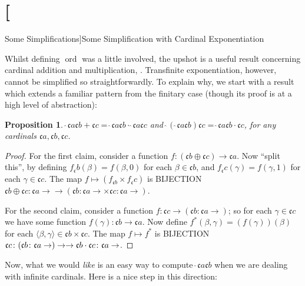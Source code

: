 \documentclass[10pt,a4paper]{article}
\makeatletter
\newcommand*{\olup}[1]{\MakeUppercase{#1}}
\theoremstyle{plain}
\newtheorem{prop}[thm]{Proposition}
\theoremstyle{definition}
\theoremstyle{remark}
\newcommand*{\olfileid}[3]{}
\newcommand*{\olsection}[1]{\section*{#1}}
\newcommand*{\ollabel}[1]{\label{#1}}
\newcommand{\olref}{\@ifnextchar[{\olref@i}{\olref@final}}
\def\olref@i[#1]{\@ifnextchar[{\olref@ii}{\olref@final}}
\def\olref@ii[#1]{\@ifnextchar[{\olref@iii}{\olref@final}}
\def\olref@iii[#1]{\olref@final}
\def\olref@final#1{\ref{#1}}
\providecommand{\tuple}[1]{\langle #1 \rangle}
\providecommand{\cardplus}{\mathbin{+}}
\providecommand{\cardtimes}{\mathbin{\cdot}}
\providecommand{\cardexpo}{\mathbin{\hat{\ }}}
\providecommand{\funfromto}[3]{#1\colon #2 \to #3}
\providecommand{\canonord}{\operatorname{ord}}
\providecommand{\cardfont}{\mathfrak{c}}
\providecommand{\disjointsum}{\mathbin{\oplus}}
\makeatother
\begin{document}
\olfileid{sth}{card-arithmetic}{expotough}

\olsection[Some Simplifications]{Some Simplification with Cardinal Exponentiation}

Whilst defining $\canonord$ was a little involved, the upshot is a
useful result concerning cardinal addition and multiplication,
\olref[simp]{cardplustimesmax}. Transfinite exponentiation, however,
cannot be simplified so straightforwardly. To explain why, we start
with a result which extends a familiar pattern from the finitary case
(though its proof is at a high level of abstraction):

\begin{prop}\ollabel{simplecardexpo}
$\cardexpo{\cardfont{a}}{\cardfont{b} \cardplus \cardfont{c}} =
\cardexpo{\cardfont{a}}{\cardfont{b}} \cardtimes
\cardexpo{\cardfont{a}}{\cardfont{c}}$ and
$\cardexpo{(\cardexpo{\cardfont{a}}{\cardfont{b}})}{\cardfont{c}} =
\cardexpo{\cardfont{a}}{\cardfont{b} \cardtimes \cardfont{c}}$, for
any cardinals $\cardfont{a}, \cardfont{b}, \cardfont{c}$.
\end{prop}

\begin{proof}
For the first claim, consider a function $f \colon
(\cardfont{b}\disjointsum\cardfont{c}) \to \cardfont{a}$. Now ``split
this'', by defining $f_\cardfont{b}(\beta) = f(\beta, 0)$ for each
$\beta \in \cardfont{b}$, and $f_\cardfont{c}(\gamma) = f(\gamma, 1)$
for each $\gamma \in \cardfont{c}$. The map $f \mapsto
(f_{\cardfont{b}} \times f_\cardfont{c})$ is \olup{bijection}
$\funfromto{\cardfont{b} \disjointsum \cardfont{c}}{\cardfont{a}} \to
(\funfromto{\cardfont{b}}{\cardfont{a}} \times
\funfromto{\cardfont{c}}{\cardfont{a}})$. 

For the second claim, consider a function $f \colon \cardfont{c} \to
(\funfromto{\cardfont{b}}{\cardfont{a}})$; so for each $\gamma \in
\cardfont{c}$ we have some function $f(\gamma) \colon \cardfont{b} \to
\cardfont{a}$. Now define $f^*(\beta, \gamma) = (f(\gamma))(\beta)$
for each $\tuple{\beta, \gamma} \in \cardfont{b} \times \cardfont{c}$.
The map $f \mapsto f^*$ is \olup{bijection}
$\funfromto{\cardfont{c}}{(\funfromto{\cardfont{b}}{\cardfont{a}})}
\to \funfromto{\cardfont{b} \cardtimes \cardfont{c}}{\cardfont{a}}$. 
\end{proof}

Now, what we would \emph{like} is an easy way to compute
$\cardexpo{\cardfont{a}}{\cardfont{b}}$ when we are dealing with
infinite cardinals. Here is a nice step in this direction:
\end{document}
